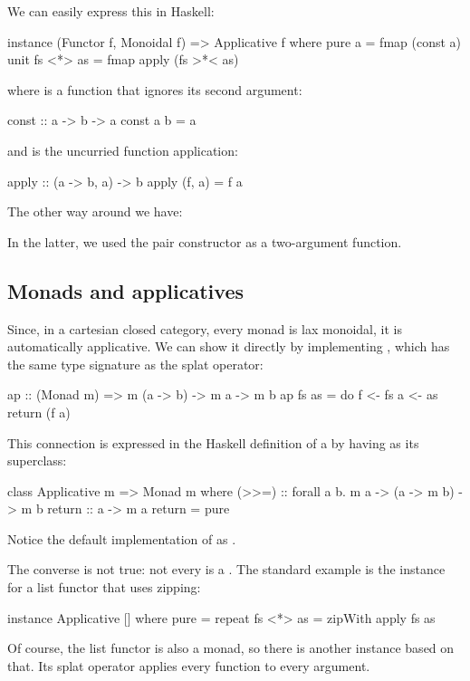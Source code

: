 \documentclass[DaoFP]{subfiles}
\begin{document}
We can easily express this in Haskell:
\begin{haskell}
instance (Functor f, Monoidal f) => Applicative f where
  pure a = fmap (const a) unit
  fs <*> as = fmap apply (fs >*< as)
\end{haskell}
where  is a function that ignores its second argument:
\begin{haskell}
const :: a -> b -> a
const a b = a
\end{haskell}
and  is the uncurried function application:
\begin{haskell}
apply :: (a -> b, a) -> b
apply (f, a) = f a
\end{haskell}
The other way around we have:
In the latter, we used the pair constructor \hask{(,)} as a two-argument function.

\subsection{Monads and applicatives}

Since, in a cartesian closed category, every monad is lax monoidal, it is automatically applicative. We can show it directly by implementing , which has the same type signature as the splat operator:
\begin{haskell}
ap :: (Monad m) => m (a -> b) -> m a -> m b
ap fs as = do 
    f <- fs
    a <- as
    return (f a) 
\end{haskell}

This connection is expressed in the Haskell definition of a  by having  as its superclass:
\begin{haskell}
class Applicative m => Monad m where
    (>>=)       :: forall a b. m a -> (a -> m b) -> m b
    return      :: a -> m a
    return      = pure
\end{haskell}
Notice the default implementation of  as . 

The converse is not true: not every  is a . The standard example is the  instance for a list functor that uses zipping:
\begin{haskell}
instance Applicative [] where
  pure = repeat
  fs <*> as = zipWith apply fs as
\end{haskell}
Of course, the list functor is also a monad, so there is another  instance based on that. Its splat operator applies every function to every argument.
\end{document}
